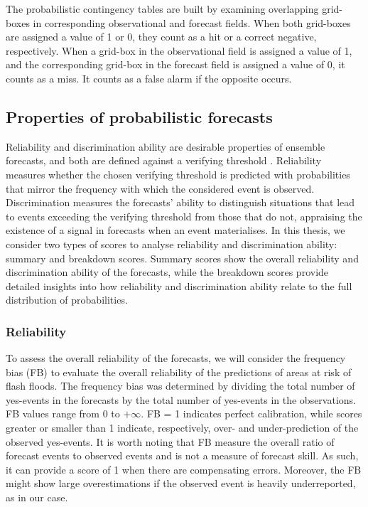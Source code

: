 The probabilistic contingency tables are built by examining overlapping grid-boxes in corresponding observational and forecast fields. When both grid-boxes are assigned a value of 1 or 0, they count as a hit or a correct negative, respectively. When a grid-box in the observational field is assigned a value of 1, and the corresponding grid-box in the forecast field is assigned a value of 0, it counts as a miss. It counts as a false alarm if the opposite occurs. 

\subsection{Properties of probabilistic forecasts}
Reliability and discrimination ability are desirable properties of ensemble forecasts, and both are defined against a verifying threshold \citep{Jolliffe_2012, Wilks_2020}. Reliability measures whether the chosen verifying threshold is predicted with probabilities that mirror the frequency with which the considered event is observed. Discrimination measures the forecasts' ability to distinguish situations that lead to events exceeding the verifying threshold from those that do not, appraising the existence of a signal in forecasts when an event materialises. In this thesis, we consider two types of scores to analyse reliability and discrimination ability: summary and breakdown scores. Summary scores show the overall reliability and discrimination ability of the forecasts, while the breakdown scores provide detailed insights into how reliability and discrimination ability relate to the full distribution of probabilities. 

\subsubsection{Reliability}
To assess the overall reliability of the forecasts, we will consider the frequency bias (FB) to evaluate the overall reliability of the predictions of areas at risk of flash floods. The frequency bias was determined by dividing the total number of yes-events in the forecasts by the total number of yes-events in the observations. FB values range from 0 to $+\infty$. FB = 1 indicates perfect calibration, while scores greater or smaller than 1 indicate, respectively, over- and under-prediction of the observed yes-events. It is worth noting that FB measure the overall ratio of forecast events to observed events and is not a measure of forecast skill. As such, it can provide a score of 1 when there are compensating errors. Moreover, the FB might show large overestimations if the observed event is heavily underreported, as in our case.

